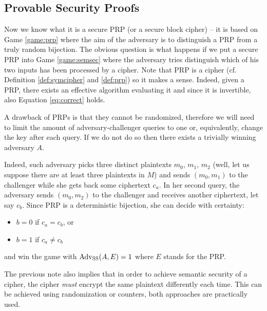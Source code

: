 
\subsection{Provable Security Proofs}

Now we know what it is a secure PRP (or a secure block cipher) -- it is based on Game \ref{game:prp} where the aim of the adversary is to distinguish a PRP from a truly random bijection. The obvious question is what happens if we put a secure PRP into Game \ref{game:semsec} where the adversary tries distinguish which of his two inputs has been processed by a cipher. Note that PRP is a cipher (cf. Definition \ref{def:symcipher} and \ref{def:prp}) so it makes a sense. Indeed, given a PRP, there exists an effective algorithm evaluating it and since it is invertible, also Equation \ref{eq:correct} holds.

\begin{note}
\label{note:singleaccess}
	A drawback of PRPs is that they cannot be randomized, therefore we will need to limit the amount of adversary-challenger queries to one or, equivalently, change the key after each query. If we do not do so then there exists a trivially winning adversary $A$.
	
	Indeed, such adversary picks three distinct plaintexts $m_0$, $m_1$, $m_2$ (well, let us suppose there are at least three plaintexts in $M$) and sends $(m_0,m_1)$ to the challenger while she gets back some ciphertext $c_a$. In her second query, the adversary sends $(m_0,m_2)$ to the challenger and receives another ciphertext, let say $c_b$. Since PRP is a deterministic bijection, she can decide with certainty:
	\begin{itemize}
		\item $b=0$ if $c_a = c_b$, or
		\item $b=1$ if $c_a \neq c_b$
	\end{itemize}
	and win the game with $\operatorname*{Adv_{SS}}(A,E) = 1$ where $E$ stands for the PRP.
\end{note}

\begin{note}
\label{note:randomize}
	The previous note also implies that in order to achieve semantic security of a cipher, the cipher {\em must} encrypt the same plaintext differently each time. This can be achieved using randomization or counters, both approaches are practically used.
\end{note}

